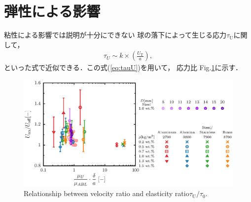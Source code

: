 \section{弾性による影響}

粘性による影響では説明が十分にできない
球の落下によって生じる応力$\tau_\text{U}$に関して，
\begin{eqnarray}
    \tau_U \sim k \times \left(\frac{U_\text{T}}{a}\right),
    \label{eq:tauU}
\end{eqnarray}
といった式で近似できる．この式(\ref{eq:tauU})を用いて，
応力比
Fig.\ref{fig:elastcity}に示す．

\begin{figure}[h]
    \centering
    \includegraphics[width=1.0\textwidth]{5-Results/elastcity.eps}
    \caption{Relationship between velocity ratio and elasticity ratio$\tau_\text{U}/\tau_\text{0}$.}
    \label{fig:elastcity}
\end{figure}
